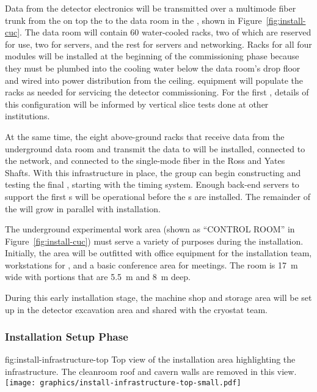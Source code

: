 Data from the detector electronics will be transmitted over a multimode fiber trunk from the  on top the  to the  data room in the , shown in Figure~\ref{fig:install-cuc}.  The data room will contain 60 water-cooled racks, two of which are reserved for  use, two for  servers, and the rest for  servers and networking. Racks for all four modules will be installed at the beginning of the  commissioning phase because they must be plumbed into the cooling water below the data room's drop floor and wired into power distribution from the ceiling.   equipment will populate the racks as needed for servicing the detector commissioning.  For the first , details of this configuration will be informed by  vertical slice tests done at other institutions.  

At the same time, the eight above-ground  racks that receive data from the underground data room and  transmit the data to  will 
be installed, connected to the network, and connected to the single-mode fiber in the Ross and Yates Shafts.  With this infrastructure in place, the  group can begin constructing and testing the final  , starting with the timing system. 
Enough  back-end servers to support the first s will be operational before the s are installed.  The remainder of the  will grow in parallel with  installation.

The underground experimental work area (shown as ``CONTROL ROOM'' in Figure~\ref{fig:install-cuc}) must serve a variety of purposes during the  installation. Initially, the area will be outfitted with office equipment for the installation team, workstations for , and a basic conference area for meetings. The room is \SI{17}{m} wide with portions that are \SI{5.5}{m} and \SI{8}{m} deep.

During this early installation stage, the machine shop and  storage area will be set up in the detector excavation area and shared with the cryostat team. 

\subsubsection{Installation Setup Phase}
\label{sec:fdsp-tc-inst-setup}

\begin{dunefigure}{fig:install-infrastructure-top}
  {Top view of the installation area highlighting the infrastructure. The cleanroom roof and cavern walls are removed in this view.}
\texttt{[image: graphics/install-infrastructure-top-small.pdf]} %
\end{dunefigure}

